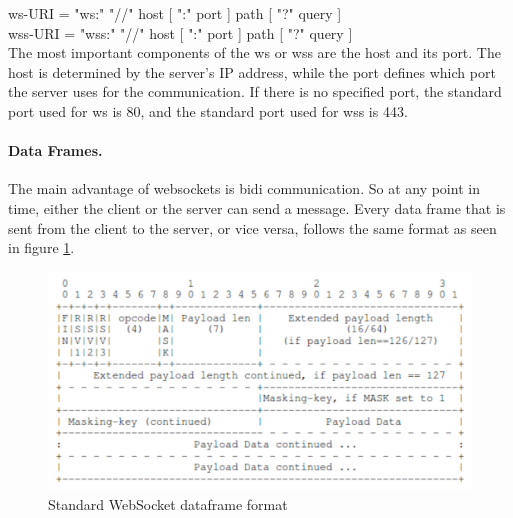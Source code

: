\documentclass[a4paper, 11pt]{report}
\begin{document}
\indent	ws-URI = "ws:" "//" host [ ":" port ] path [ "?" query ]\\
\indent	wss-URI = "wss:" "//" host [ ":" port ] path [ "?" query ]\\

The most important components of the ws or wss are the host and its port. The host is determined by the server's IP address, while the port defines which port the server uses for the communication. If there is no specified port, the standard port used for ws is 80, and the standard port used for wss is 443.
		
		\paragraph{Data Frames.}
The main advantage of websockets is bidi communication. So at any point in time, either the client or the server can send a message. Every data frame that is sent from the client to the server, or vice versa, follows the same format as seen in figure \ref{fig:dataFrame}.

	\begin{figure}[ht]
		\centering
		\includegraphics[scale=0.5]{images/WebSocketDataFrame.pdf}
		\caption{Standard WebSocket dataframe format}\label{fig:dataFrame}
	\end{figure}
\end{document}

